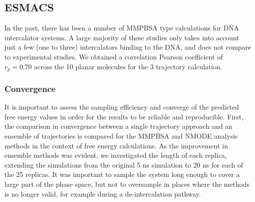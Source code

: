 \subsection{ESMACS}

In the past, there has been a number of MMPBSA type calculations for DNA intercalator systems. A large majority of these studies only takes into account just a few (one to three) intercalators binding to the DNA, and does not compare to experimental studies. We obtained a correlation Pearson coefficient of $r_p=0.70$ across the 10 planar molecules for the 3 trajectory calculation.

\subsubsection{Convergence}

It is important to assess the sampling efficiency and converge of the predicted free energy values in order for the results to be reliable and reproducible.
First, the comparison in convergence between a single trajectory approach and an ensemble of trajectories is compared for the MMPBSA and NMODE analysis methods in the context of free energy calculations. As the improvement in ensemble methods was evident, we investigated the length of each replica, extending the simulations from the original 5 ns simulation to 20 ns for each of the 25 replicas. It was important to sample the system long enough to cover a large part of the phase space, but not to oversample in places where the methods is no longer valid, for example during a de-intercalation pathway.

